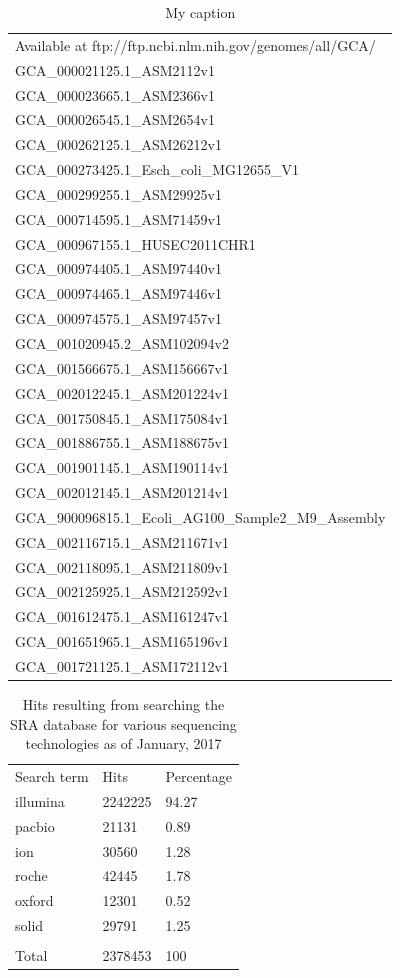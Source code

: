 \documentclass[10pt]{article}
\begin{document}
\begin{table}[]
\centering
\caption{My caption}
\label{accessions}
\begin{tabular}{l}
Available at ftp://ftp.ncbi.nlm.nih.gov/genomes/all/GCA/ \\
GCA\_000021125.1\_ASM2112v1 \\
GCA\_000023665.1\_ASM2366v1 \\
GCA\_000026545.1\_ASM2654v1 \\
GCA\_000262125.1\_ASM26212v1 \\
GCA\_000273425.1\_Esch\_coli\_MG12655\_V1 \\
GCA\_000299255.1\_ASM29925v1 \\
GCA\_000714595.1\_ASM71459v1 \\
GCA\_000967155.1\_HUSEC2011CHR1 \\
GCA\_000974405.1\_ASM97440v1 \\
GCA\_000974465.1\_ASM97446v1 \\
GCA\_000974575.1\_ASM97457v1 \\
GCA\_001020945.2\_ASM102094v2 \\
GCA\_001566675.1\_ASM156667v1 \\
GCA\_002012245.1\_ASM201224v1 \\
GCA\_001750845.1\_ASM175084v1 \\
GCA\_001886755.1\_ASM188675v1 \\
GCA\_001901145.1\_ASM190114v1 \\
GCA\_002012145.1\_ASM201214v1 \\
GCA\_900096815.1\_Ecoli\_AG100\_Sample2\_M9\_Assembly \\
GCA\_002116715.1\_ASM211671v1 \\
GCA\_002118095.1\_ASM211809v1 \\
GCA\_002125925.1\_ASM212592v1 \\
GCA\_001612475.1\_ASM161247v1 \\
GCA\_001651965.1\_ASM165196v1 \\
GCA\_001721125.1\_ASM172112v1
\end{tabular}
\end{table}

\begin{table}[]
\centering
\caption{Hits resulting from searching the SRA database for various sequencing technologies as of January, 2017}
\label{searchterms}
\begin{tabular}{lll}
  Search term & Hits & Percentage \\
  illumina & 2242225 & 94.27 \\
  pacbio & 21131 & 0.89 \\
  ion & 30560 & 1.28 \\
  roche & 42445 & 1.78 \\
  oxford & 12301 & 0.52 \\
  solid & 29791 & 1.25 \\
              & & \\
  Total & 2378453 & 100
\end{tabular}
\end{table}
\end{document}
